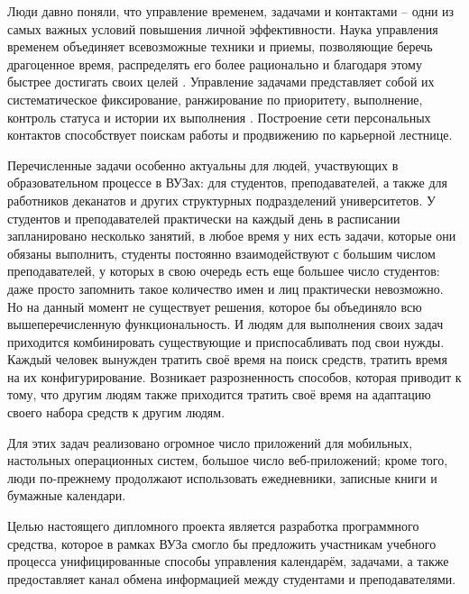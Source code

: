 \label{sec:introduction}

Люди давно поняли, что управление временем, задачами и контактами -- одни из самых важных условий повышения личной эффективности. Наука управления временем объединяет всевозможные техники и приемы, позволяющие беречь драгоценное время, распределять его более рационально и благодаря этому быстрее достигать своих целей \cite{time_management}. Управление задачами представляет собой их систематическое фиксирование, ранжирование по приоритету, выполнение, контроль статуса и истории их выполнения \cite{task_management}. Построение сети персональных контактов способствует поискам работы и продвижению по карьерной лестнице. 

Перечисленные задачи особенно актуальны для людей, участвующих в образовательном процессе в ВУЗах: для студентов, преподавателей, а также для работников деканатов и других структурных подразделений университетов. У студентов и преподавателей практически на каждый день в расписании запланировано несколько занятий, в любое время у них есть задачи, которые они обязаны выполнить, студенты постоянно взаимодействуют с большим числом преподавателей, у которых в свою очередь есть еще большее число студентов: даже просто запомнить такое количество имен и лиц практически невозможно. Но на данный момент не существует решения, которое бы объединяло всю вышеперечисленную функциональность. И людям для выполнения своих задач приходится комбинировать существующие и приспосабливать под свои нужды. Каждый человек вынужден тратить своё время на поиск средств, тратить время на их конфигурирование. Возникает разрозненность способов, которая приводит к тому, что другим людям также приходится тратить своё время на адаптацию своего набора средств к другим людям. 

Для этих задач реализовано огромное число приложений для мобильных, настольных операционных систем, большое число  веб-приложений; кроме того, люди по-прежнему продолжают использовать ежедневники, записные книги и бумажные календари.

Целью настоящего дипломного проекта является разработка программного средства, которое в рамках ВУЗа смогло бы предложить участникам учебного процесса унифицированные способы управления календарём, задачами, а также предоставляет канал обмена информацией между студентами и преподавателями. 

